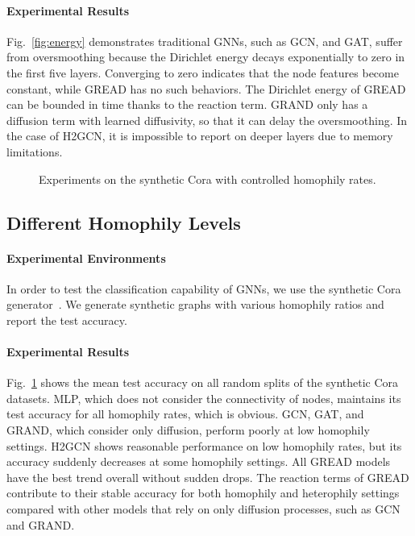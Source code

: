 \documentclass{article}
\theoremstyle{plain}
\theoremstyle{definition}
\theoremstyle{remark}
\begin{document}
\paragraph{Experimental Results} Fig.~\ref{fig:energy} demonstrates traditional GNNs, such as GCN, and GAT, suffer from oversmoothing because the Dirichlet energy decays exponentially to zero in the first five layers. Converging to zero indicates that the node features become constant, while GREAD has no such behaviors. The Dirichlet energy of GREAD can be bounded in time thanks to the reaction term. GRAND only has a diffusion term with learned diffusivity, so that it can delay the oversmoothing. In the case of H2GCN, it is impossible to report on deeper layers due to memory limitations.

\begin{figure}[t]
    \centering
    \caption{Experiments on the synthetic Cora with controlled homophily rates.}
\label{fig:syn_cora}
\end{figure}

\subsection{Different Homophily Levels}
\paragraph{Experimental Environments} In order to test the classification capability of GNNs, we use the synthetic Cora generator~\cite{zhu2020h2gcn,li2021deeprobust}. We generate synthetic graphs with various homophily ratios and report the test accuracy.

\paragraph{Experimental Results} Fig.~\ref{fig:syn_cora} shows the mean test accuracy on all random splits of the synthetic Cora datasets. MLP, which does not consider the connectivity of nodes, maintains its test accuracy for all homophily rates, which is obvious. GCN, GAT, and GRAND, which consider only diffusion, perform poorly at low homophily settings. H2GCN shows reasonable performance on low homophily rates, but its accuracy suddenly decreases at some homophily settings. All GREAD models have the best trend overall without sudden drops. The reaction terms of GREAD contribute to their stable accuracy for both homophily and heterophily settings compared with other models that rely on only diffusion processes, such as GCN and GRAND.
\end{document}
